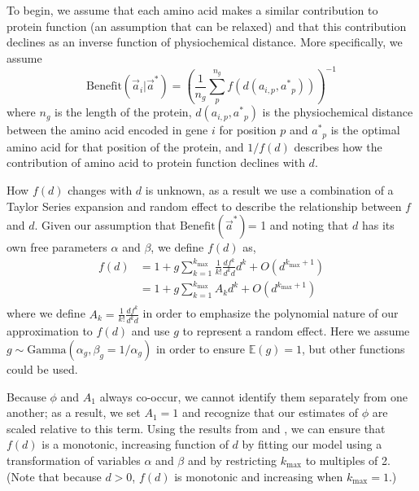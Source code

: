 \documentclass{article}
\newcommand{\EE}{\mathbb{E}} %
\newcommand{\kmax}{\ensuremath{{k_{\max}}}\xspace}
\newcommand{\aip}{\ensuremath{a_{i,p}}\xspace}
\newcommand{\aveci}{\ensuremath{\Vec{a}_i}\xspace}
\newcommand{\aopt}{\ensuremath{a^*}\xspace}
\newcommand{\aoptp}{\ensuremath{\aopt_p}\xspace}
\newcommand{\aoptvec}{\ensuremath{\Vec{a}^*}\xspace}
\newcommand{\Func}{\ensuremath{\text{Benefit}}\xspace}
\newcommand{\Funcaveci}{\ensuremath{\Func(\aveci|\aoptvec)}\xspace}
\newcommand{\Funcaoptvec}{\ensuremath{\Func(\aoptvec)}\xspace}
\renewcommand{\ng}{\ensuremath{{n_g}}\xspace}
\begin{document}
To begin, we assume that each amino acid makes a similar contribution to protein function (an assumption that can be relaxed) and that this contribution declines as an inverse function of physiochemical distance.
More specifically, we assume 
\begin{equation}
\Funcaveci = \left(\frac{1}{\ng} \sum_p^\ng{} f\left(d\left(\aip, \aoptp\right)\right)\right)^{-1}
\end{equation}
where $\ng$ is the length of the protein, $d(\aip, \aoptp)$ is the physiochemical distance between the amino acid encoded in gene $i$ for position $p$ and $\aoptp$ is the optimal amino acid for that position of the protein, and $1/f(d)$ describes how the contribution of amino acid to protein function declines with $d$.

How $f(d)$ changes with $d$ is unknown, as a result we use a combination of a Taylor Series expansion and random effect to describe the relationship between $f$ and $d$.
Given our assumption that \Funcaoptvec = 1 and noting that $d$ has its own free parameters $\alpha$ and $\beta$, we define $f(d)$ as,
\begin{align}
  \label{eq:fSeriesDef}
  f(d) &= 1 + g \sum_{k=1}^\kmax \frac{1}{k!}\frac{d f^k}{d^k d} d^k + O(d^{\kmax+1})\\
  & = 1 + g \sum_{k=1}^\kmax A_k d^k + O(d^{\kmax+1})\\
\end{align}
where we define $A_k = \frac{1}{k!}\frac{d f^k}{d^k d}$ in order to emphasize the polynomial nature of our approximation to $f(d)$ and use $g$ to represent a random effect.
Here we assume $g \sim \text{Gamma}\left(\alpha_g, \beta_g = 1/\alpha_g\right)$ in order to ensure $\EE(g) = 1$, but other functions could be used.

Because $\phi$ and $A_1$ always co-occur, we cannot identify them separately from one another; as a result, we set $A_1 = 1$ and recognize that our estimates of $\phi$ are scaled relative to this term.
Using the results from \citet{Liang07} and \citet{Elphinstone85}, we can ensure that $f(d)$ is a monotonic, increasing function of $d$ by fitting our model using a transformation of variables $\alpha$ and $\beta$ and by restricting \kmax to multiples of 2. (Note that because $d > 0$, $f(d)$ is monotonic and increasing when $\kmax=1$.)
\end{document}
